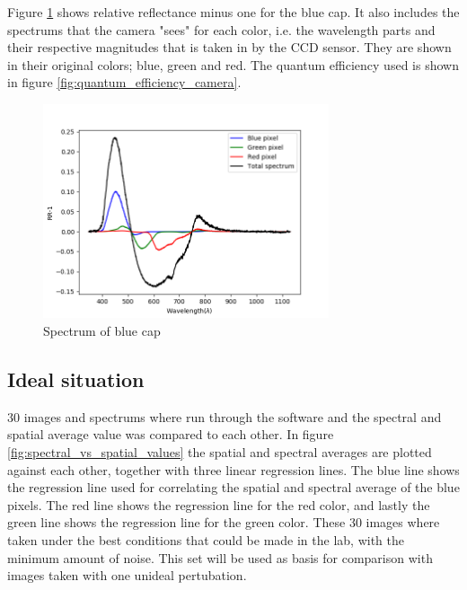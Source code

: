 Figure \ref{fig:blue_cap_spectrum} shows relative reflectance minus one for the blue cap. It also includes the spectrums that the camera "sees" for each color, i.e. the wavelength parts and their respective magnitudes that is taken in by the CCD sensor. They are shown in their original colors; blue, green and red. The quantum efficiency used is shown in figure \ref{fig:quantum_efficiency_camera}. 

\begin{figure}[h]
    \centering
    \includegraphics[width=0.75\textwidth]{Plots/blue_cap_rr_minus_one_with_qe.png}    
    \caption{Spectrum of blue cap}
    \label{fig:blue_cap_spectrum}
\end{figure}


\subsection{Ideal situation}
\label{sec:ideal_situation}
30 images and spectrums where run through the software and the spectral and spatial average value was compared to each other. In figure \ref{fig:spectral_vs_spatial_values} the spatial and spectral averages are plotted against each other, together with three linear regression lines. The blue line shows the regression line used for correlating the spatial and spectral average of the blue pixels. The red line shows the regression line for the red color, and lastly the green line shows the regression line for the green color. These 30 images where taken under the best conditions that could be made in the lab, with the minimum amount of noise. This set will be used as basis for comparison with images taken with one unideal pertubation. 

